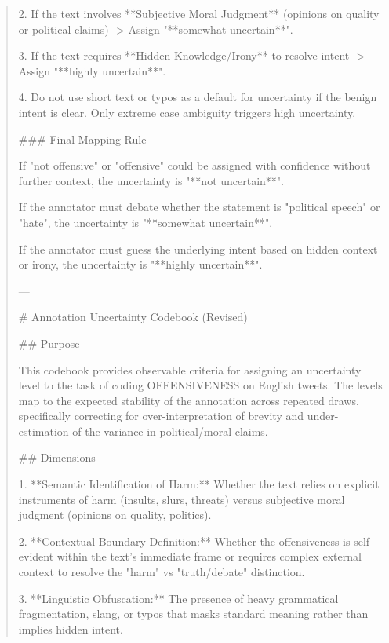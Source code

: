 \begin{quote}
2.  If the text involves **Subjective Moral Judgment** (opinions on quality or political claims) -> Assign "**somewhat uncertain**".

3.  If the text requires **Hidden Knowledge/Irony** to resolve intent -> Assign "**highly uncertain**".

4.  Do not use short text or typos as a default for uncertainty if the benign intent is clear. Only extreme case ambiguity triggers high uncertainty.



### Final Mapping Rule

If "not offensive" or "offensive" could be assigned with confidence without further context, the uncertainty is "**not uncertain**".

If the annotator must debate whether the statement is "political speech" or "hate", the uncertainty is "**somewhat uncertain**".

If the annotator must guess the underlying intent based on hidden context or irony, the uncertainty is "**highly uncertain**".





---



# Annotation Uncertainty Codebook (Revised)



## Purpose

This codebook provides observable criteria for assigning an uncertainty level to the task of coding OFFENSIVENESS on English tweets. The levels map to the expected stability of the annotation across repeated draws, specifically correcting for over-interpretation of brevity and under-estimation of the variance in political/moral claims.



## Dimensions

1. **Semantic Identification of Harm:** Whether the text relies on explicit instruments of harm (insults, slurs, threats) versus subjective moral judgment (opinions on quality, politics).

2. **Contextual Boundary Definition:** Whether the offensiveness is self-evident within the text's immediate frame or requires complex external context to resolve the "harm" vs "truth/debate" distinction.

3. **Linguistic Obfuscation:** The presence of heavy grammatical fragmentation, slang, or typos that masks standard meaning rather than implies hidden intent.




\end{quote}

